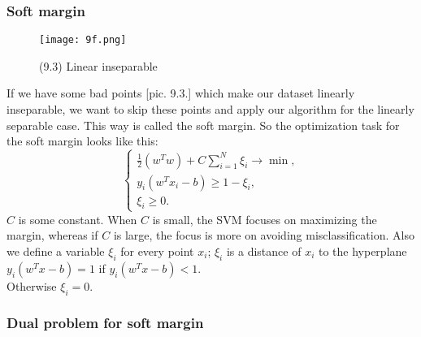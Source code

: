 \subsubsection*{Soft margin}

\begin{wrapfigure}{r}{0.33\linewidth}
  \vspace{-1.4cm}
  \begin{center}
    \texttt{[image: 9f.png]}
  \end{center}
  \vspace{-0.8cm}
  \caption*{(9.3) Linear inseparable}
  \vspace{-2cm}
\end{wrapfigure}
If we have some bad points [pic. 9.3.] which make our dataset linearly inseparable, we want to skip these points and apply our algorithm for the linearly separable case. This way is called the soft margin. So the optimization task for the soft margin looks like this:
$$\begin{cases}
	\frac{1}{2}(w^Tw)+C\sum\limits_{i=1}^{N}\xi_i\to\min, \\
	y_i(w^Tx_i-b)\ge1-\xi_i, \\
	\xi_i\ge0.
\end{cases}$$
$C$ is some constant. When $C$ is small, the SVM focuses on maximizing the margin, whereas if $C$ is large, the focus is more on avoiding misclassification. Also we define a variable $\xi_i$ for every point $x_i$; $\xi_i$ is a distance of $x_i$ to the hyperplane $y_i(w^Tx-b)=1$ if $y_i(w^Tx-b)<1$.\\
Otherwise $\xi_i=0$.

\subsubsection*{Dual problem for soft margin}


